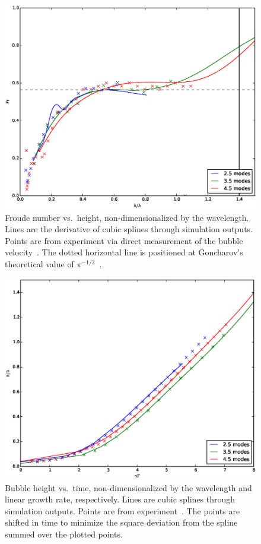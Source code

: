\begin{figure}
\includegraphics[width=\textwidth]{plts/Fr}
\caption{  
Froude number vs.\ height, non-dimensionalized by the wavelength.
Lines are the derivative of cubic splines through simulation outputs.
Points are from experiment via direct measurement of the bubble velocity~\cite{JacobsPrivate}.
The dotted horizontal line is positioned at Goncharov's theoretical value of $\pi^{-1/2}$~\cite{Goncharov2002}.
}
\end{figure}

\begin{figure}
\includegraphics[width=\textwidth]{plts/aspect}
\caption{  
Bubble height vs.\ time, non-dimensionalized by the wavelength and linear growth rate, respectively.
Lines are cubic splines through simulation outputs.
Points are from experiment~\cite{JacobsPrivate}.
The points are shifted in time to minimize the square deviation from the spline summed over the plotted points.
}
\end{figure}

